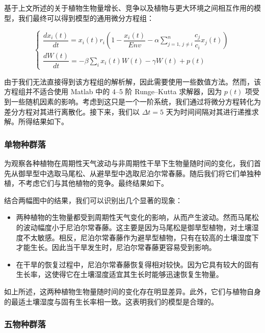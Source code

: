 \documentclass[11pt,a4paper]{ctexart}
\begin{document}
基于上文所述的关于植物生物量增长、竞争以及植物与更大环境之间相互作用的模型，我们最终可以得到模型的通用微分方程组：

\begin{equation}
\begin{cases}
\dfrac{dx_i(t)}{dt}=x_i(t)r_i\left(1-\dfrac{x_i(t)}{Env}-\alpha\sum\limits_{j=1,\,j\neq i}^{n}\dfrac{c_j}{c_i}x_j(t)\right)\\[1.4em]
\dfrac{dW(t)}{dt}=-\beta\sum\limits_{i}x_i(t)W(t)-\gamma W(t)+p(t)
\end{cases}
\label{eq:system}
\end{equation}

由于我们无法直接得到该方程组的解析解，因此需要使用一些数值方法。然而，该方程组并不适合使用 Matlab 中的 4--5 阶 Runge--Kutta 求解器，因为 $p(t)$ 项受到一些随机因素的影响。考虑到这只是一个一阶系统，我们通过将微分方程转化为差分方程对其进行离散化。接下来，我们以 $\Delta t=5$ 天为时间间隔对其进行递推求解。所得结果如下。

\subsubsection{单物种群落}

为观察各种植物在周期性天气波动与非周期性干旱下生物量随时间的变化，我们首先从御旱型中选取马尾松、从避旱型中选取尼泊尔常春藤。随后我们将它们单独种植，不考虑它们与其他植物的竞争。最终结果如下。

结合两幅图中的结果，我们可以识别出几个显著的现象：

\begin{itemize}
\item 两种植物的生物量都受到周期性天气变化的影响，从而产生波动。然而马尾松的波动幅度小于尼泊尔常春藤。这主要是因为马尾松是御旱型植物，对土壤湿度不太敏感。相反，尼泊尔常春藤作为避旱型植物，只有在较高的土壤湿度下才能生长。因此当干旱发生时，尼泊尔常春藤更容易受到影响。
\item 在干旱的恢复过程中，尼泊尔常春藤恢复得相对较快。因为它具有较大的固有生长率，这使得它在土壤湿度适宜其生长时能够迅速恢复生物量。
\end{itemize}

如上所述，这两种植物生物量随时间的变化存在明显差异。此外，它们与植物自身的最适土壤湿度与固有生长率相一致。这表明我们的模型是合理的。

\subsubsection{五物种群落}
\end{document}

